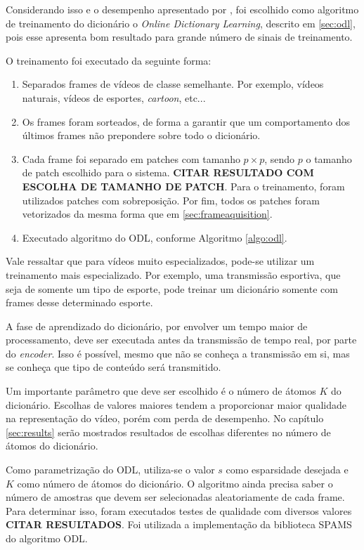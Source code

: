 \documentclass[cic,tc]{iiufrgs}
\begin{document}
Considerando isso e o desempenho apresentado por \citet{MairalOnlineDictLearn}, foi escolhido
como algoritmo de treinamento do dicionário o \textit{Online Dictionary Learning},
descrito em \ref{sec:odl},
pois esse apresenta bom resultado para grande número de sinais de treinamento.

O treinamento foi executado da seguinte forma:
\begin{enumerate}
    \item Separados frames de vídeos de classe semelhante. Por exemplo, vídeos naturais, vídeos
    de esportes, \textit{cartoon}, etc...
    \item Os frames foram sorteados, de forma a garantir que um comportamento dos últimos frames
    não prepondere sobre todo o dicionário.
    \item Cada frame foi separado em patches com tamanho $p \times p$, sendo $p$ o tamanho de
    patch escolhido para o sistema. \textbf{CITAR RESULTADO COM ESCOLHA DE TAMANHO DE PATCH}.
    Para o treinamento, foram utilizados patches com sobreposição. Por fim, todos os patches
    foram vetorizados da mesma forma que em \ref{sec:frameaquisition}.
    \item Executado algoritmo do ODL, conforme Algoritmo \ref{algo:odl}.
\end{enumerate}

Vale ressaltar que para vídeos muito especializados, pode-se utilizar um treinamento
mais especializado. Por exemplo, uma transmissão esportiva, que seja de somente um tipo
de esporte, pode treinar um dicionário somente com frames desse determinado esporte.

A fase de aprendizado do dicionário, por envolver um tempo maior de processamento,
deve ser executada antes da transmissão de tempo real, por parte do \textit{encoder}.
Isso é possível, mesmo que não
se conheça a transmissão em si, mas se conheça que tipo de conteúdo será transmitido.

Um importante parâmetro que deve ser escolhido é o número de átomos $K$ do dicionário.
Escolhas de valores maiores tendem a proporcionar maior qualidade na representação do vídeo,
porém com perda de desempenho. No capítulo \ref{sec:results} serão mostrados resultados
de escolhas diferentes no número de átomos do dicionário.

Como parametrização do ODL, utiliza-se o valor $s$ como esparsidade desejada e
$K$ como número de átomos do dicionário.
O algoritmo ainda precisa saber o número de amostras que devem ser selecionadas aleatoriamente
de cada frame.
Para determinar isso, foram executados testes de qualidade com diversos valores
\textbf{CITAR RESULTADOS}.
Foi utilizada a implementação da biblioteca SPAMS \cite{SPAMS} do algoritmo ODL.
\end{document}
